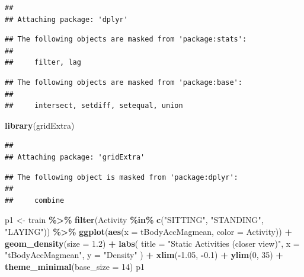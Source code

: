 \documentclass[
]{article}
\newenvironment{Shaded}{\begin{snugshade}}{\end{snugshade}}
\newcommand{\AttributeTok}[1]{\textcolor[rgb]{0.13,0.29,0.53}{#1}}
\newcommand{\DecValTok}[1]{\textcolor[rgb]{0.00,0.00,0.81}{#1}}
\newcommand{\FloatTok}[1]{\textcolor[rgb]{0.00,0.00,0.81}{#1}}
\newcommand{\FunctionTok}[1]{\textcolor[rgb]{0.13,0.29,0.53}{\textbf{#1}}}
\newcommand{\NormalTok}[1]{#1}
\newcommand{\OtherTok}[1]{\textcolor[rgb]{0.56,0.35,0.01}{#1}}
\newcommand{\SpecialCharTok}[1]{\textcolor[rgb]{0.81,0.36,0.00}{\textbf{#1}}}
\newcommand{\StringTok}[1]{\textcolor[rgb]{0.31,0.60,0.02}{#1}}
\begin{document}
\begin{verbatim}
## 
## Attaching package: 'dplyr'
\end{verbatim}

\begin{verbatim}
## The following objects are masked from 'package:stats':
## 
##     filter, lag
\end{verbatim}

\begin{verbatim}
## The following objects are masked from 'package:base':
## 
##     intersect, setdiff, setequal, union
\end{verbatim}

\begin{Shaded}
\begin{Highlighting}[]
\FunctionTok{library}\NormalTok{(gridExtra)}
\end{Highlighting}
\end{Shaded}

\begin{verbatim}
## 
## Attaching package: 'gridExtra'
\end{verbatim}

\begin{verbatim}
## The following object is masked from 'package:dplyr':
## 
##     combine
\end{verbatim}

\begin{Shaded}
\begin{Highlighting}[]
\NormalTok{p1 }\OtherTok{\textless{}{-}}\NormalTok{ train }\SpecialCharTok{\%\textgreater{}\%}
  \FunctionTok{filter}\NormalTok{(Activity }\SpecialCharTok{\%in\%} \FunctionTok{c}\NormalTok{(}\StringTok{"SITTING"}\NormalTok{, }\StringTok{"STANDING"}\NormalTok{, }\StringTok{"LAYING"}\NormalTok{)) }\SpecialCharTok{\%\textgreater{}\%}
  \FunctionTok{ggplot}\NormalTok{(}\FunctionTok{aes}\NormalTok{(}\AttributeTok{x =}\NormalTok{ tBodyAccMagmean, }\AttributeTok{color =}\NormalTok{ Activity)) }\SpecialCharTok{+}
  \FunctionTok{geom\_density}\NormalTok{(}\AttributeTok{size =} \FloatTok{1.2}\NormalTok{) }\SpecialCharTok{+}
  \FunctionTok{labs}\NormalTok{(}
    \AttributeTok{title =} \StringTok{"Static Activities (closer view)"}\NormalTok{,}
    \AttributeTok{x =} \StringTok{"tBodyAccMagmean"}\NormalTok{,}
    \AttributeTok{y =} \StringTok{"Density"}
\NormalTok{  ) }\SpecialCharTok{+}
  \FunctionTok{xlim}\NormalTok{(}\SpecialCharTok{{-}}\FloatTok{1.05}\NormalTok{, }\SpecialCharTok{{-}}\FloatTok{0.1}\NormalTok{) }\SpecialCharTok{+}
  \FunctionTok{ylim}\NormalTok{(}\DecValTok{0}\NormalTok{, }\DecValTok{35}\NormalTok{) }\SpecialCharTok{+}
  \FunctionTok{theme\_minimal}\NormalTok{(}\AttributeTok{base\_size =} \DecValTok{14}\NormalTok{)}
\NormalTok{p1}
\end{Highlighting}
\end{Shaded}
\end{document}
